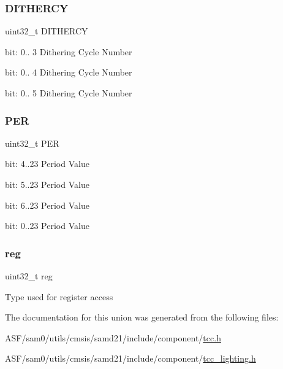 \subsubsection{\texorpdfstring{DITHERCY}{DITHERCY}}
{\footnotesize\ttfamily uint32\+\_\+t D\+I\+T\+H\+E\+R\+CY}

bit\+: 0.. 3 Dithering Cycle Number

bit\+: 0.. 4 Dithering Cycle Number

bit\+: 0.. 5 Dithering Cycle Number \mbox{\label{union_t_c_c___p_e_r___type_a3a85cb8e507302b97a36eaf1c13d0b72}} 
\subsubsection{\texorpdfstring{PER}{PER}}
{\footnotesize\ttfamily uint32\+\_\+t P\+ER}

bit\+: 4..23 Period Value

bit\+: 5..23 Period Value

bit\+: 6..23 Period Value

bit\+: 0..23 Period Value \mbox{\label{union_t_c_c___p_e_r___type_a6b91636401516a477989a336376d7b40}} 
\subsubsection{\texorpdfstring{reg}{reg}}
{\footnotesize\ttfamily uint32\+\_\+t reg}

Type used for register access 

The documentation for this union was generated from the following files\+:\begin{DoxyCompactItemize}
\item 
A\+S\+F/sam0/utils/cmsis/samd21/include/component/\mbox{\hyperlink{tcc_8h}{tcc.\+h}}\item 
A\+S\+F/sam0/utils/cmsis/samd21/include/component/\mbox{\hyperlink{tcc__lighting_8h}{tcc\+\_\+lighting.\+h}}\end{DoxyCompactItemize}
